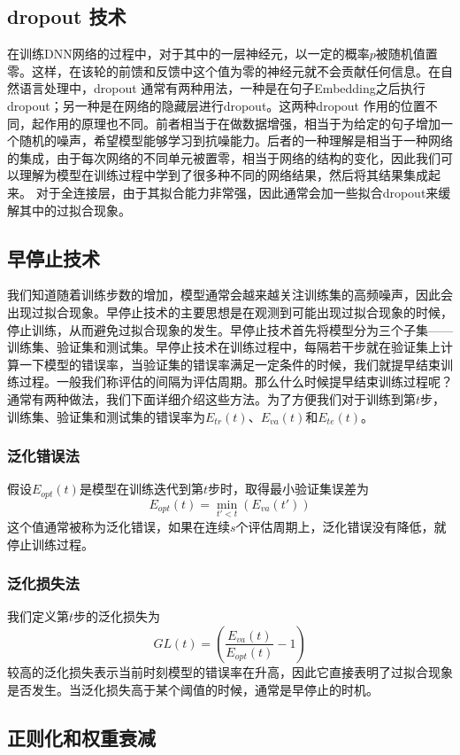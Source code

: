 \documentclass[twoside,a4paper,12pt]{book}%
\begin{document}
\subsection{dropout 技术}
在训练DNN网络的过程中，对于其中的一层神经元，以一定的概率$p$被随机值置零。这样，在该轮的前馈和反馈中这个值为零的神经元就不会贡献任何信息。在自然语言处理中，dropout 通常有两种用法，一种是在句子Embedding之后执行dropout；另一种是在网络的隐藏层进行dropout。这两种dropout 作用的位置不同，起作用的原理也不同。前者相当于在做数据增强，相当于为给定的句子增加一个随机的噪声，希望模型能够学习到抗噪能力。后者的一种理解是相当于一种网络的集成，由于每次网络的不同单元被置零，相当于网络的结构的变化，因此我们可以理解为模型在训练过程中学到了很多种不同的网络结果，然后将其结果集成起来。
对于全连接层，由于其拟合能力非常强，因此通常会加一些拟合dropout来缓解其中的过拟合现象。
\subsection{早停止技术}
我们知道随着训练步数的增加，模型通常会越来越关注训练集的高频噪声，因此会出现过拟合现象。早停止技术的主要思想是在观测到可能出现过拟合现象的时候，停止训练，从而避免过拟合现象的发生。早停止技术首先将模型分为三个子集——训练集、验证集和测试集。早停止技术在训练过程中，每隔若干步就在验证集上计算一下模型的错误率，当验证集的错误率满足一定条件的时候，我们就提早结束训练过程。一般我们称评估的间隔为评估周期。那么什么时候提早结束训练过程呢？通常有两种做法，我们下面详细介绍这些方法。为了方便我们对于训练到第$t$步，训练集、验证集和测试集的错误率为$E_{tr}(t)$、$E_{va}(t)$和$E_{te}(t)$。
\subsubsection{泛化错误法}
假设$E_{opt}(t)$是模型在训练迭代到第$t$步时，取得最小验证集误差为
$$
E_{opt}(t) = \min_{t'<t}(E_{va}(t'))
$$
这个值通常被称为泛化错误，如果在连续$s$个评估周期上，泛化错误没有降低，就停止训练过程。
\subsubsection{泛化损失法}
我们定义第$t$步的泛化损失为
$$
GL(t)=(\frac{E_{va}(t)}{E_{opt}(t)}-1)
$$
较高的泛化损失表示当前时刻模型的错误率在升高，因此它直接表明了过拟合现象是否发生。当泛化损失高于某个阈值的时候，通常是早停止的时机。


\subsection{正则化和权重衰减}
\end{document}
